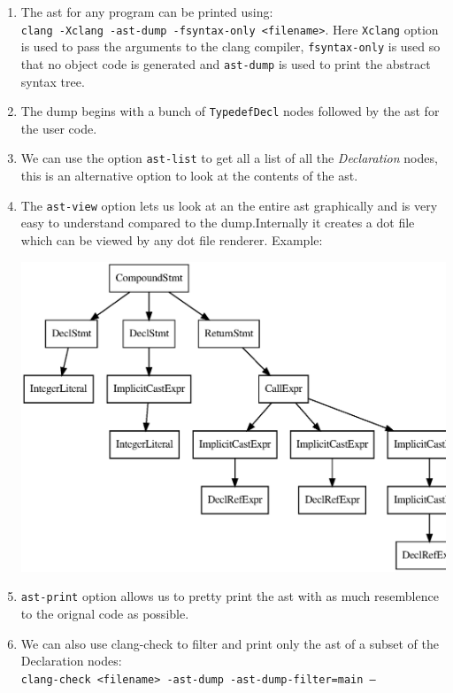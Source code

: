 \documentclass[12pt]{article}
\newcommand{\code}{\texttt}
\begin{document}
\begin{enumerate}
\item The ast for any program can be printed using:\\ \code{clang -Xclang -ast-dump -fsyntax-only <filename>}. Here \code{Xclang} option is used to pass the arguments to the clang compiler, \code{fsyntax-only} is used so that no object code is generated and \code{ast-dump} is used to print the abstract syntax tree.
\item The dump begins with a bunch of \code{TypedefDecl} nodes followed by the ast for the user code.
\item We can use the option \code{ast-list} to get all a list of all the \textit{Declaration} nodes, this is an alternative option to look at the contents of the ast.
\item The \code{ast-view} option lets us look at an the entire ast graphically and is very easy to understand compared to the dump.Internally it creates a dot file which can be viewed by any dot file renderer. Example:
\begin{center}
\includegraphics[scale=0.6]{clangExamples/graph.eps}
\end{center}
\item \texttt{ast-print} option allows us to pretty print the ast with as much resemblence to the orignal code as possible.
\item We can also use clang-check to filter and print only the ast of a subset of the Declaration nodes:\\
\code{clang-check <filename> -ast-dump -ast-dump-filter=main --}
\end{enumerate}
\end{document}
